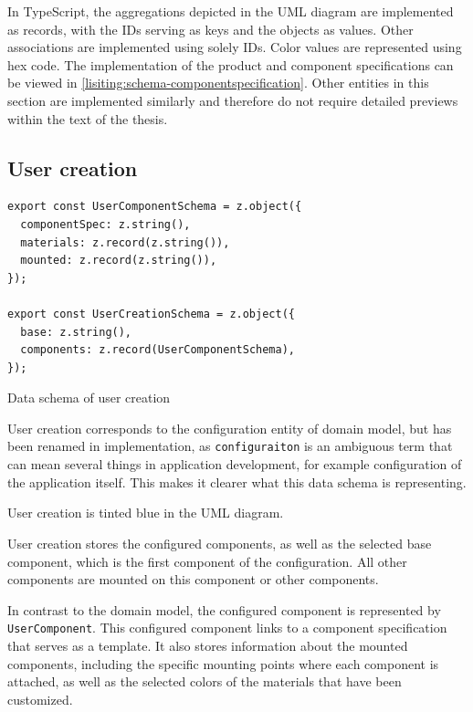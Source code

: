 In TypeScript, the aggregations depicted in the UML diagram are implemented as records, with the IDs serving as keys and the objects as values. Other associations are implemented using solely IDs. Color values are represented using hex code. The implementation of the product and component specifications can be viewed in \autoref{lisiting:schema-componentspecification}. Other entities in this section are implemented similarly and therefore do not require detailed previews within the text of the thesis.


\subsection{User creation}

\begin{listing}[h]
\begin{verbatim}
export const UserComponentSchema = z.object({
  componentSpec: z.string(),
  materials: z.record(z.string()),
  mounted: z.record(z.string()),
});

export const UserCreationSchema = z.object({
  base: z.string(),
  components: z.record(UserComponentSchema),
});
\end{verbatim}
\caption{Data schema of user creation}
\label{lisiting:schema-usercreation}
\end{listing}

User creation corresponds to the configuration entity of domain model, but has been renamed in implementation, as \texttt{configuraiton} is an ambiguous term that can mean several things in application development, for example configuration of the application itself. This makes it clearer what this data schema is representing.

User creation is tinted blue in the UML diagram.

User creation stores the configured components, as well as the selected base component, which is the first component of the configuration. All other components are mounted on this component or other components.

In contrast to the domain model, the configured component is represented by \texttt{UserComponent}. This configured component links to a component specification that serves as a template. It also stores information about the mounted components, including the specific mounting points where each component is attached, as well as the selected colors of the materials that have been customized.

